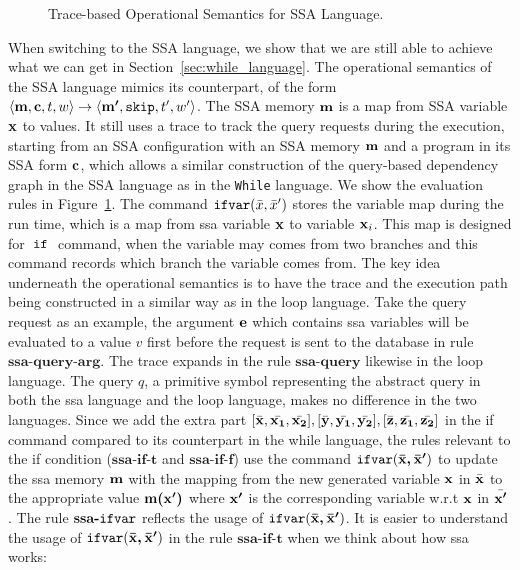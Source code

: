 {\begin{figure}
      \caption{Trace-based Operational Semantics for SSA Language.}
      \label{fig:os_ssa}
  \end{figure}
%
{
When switching to the SSA language, we show that we are still able to achieve what we can get in Section~\ref{sec:while_language}. 
The operational semantics of the SSA language mimics its counterpart, of the form $\langle {\boldsymbol{\mathbf{m}}}, {\boldsymbol{\mathbf{c}}}, t, w \rangle \to \langle {\boldsymbol{\mathbf{m'}}}, \mathtt{skip}, t', w' \rangle$. 
The SSA memory ${\boldsymbol{\mathbf{m}}}$ is a map from SSA variable ${\boldsymbol{\mathbf{x}}}$ to values.
It still uses a trace to track the query requests during the execution, starting from an SSA configuration with an SSA memory ${\boldsymbol{\mathbf{m}}}$ and a program in its SSA form ${\boldsymbol{\mathbf{c}}}$, 
which allows a similar construction of the query-based dependency graph in the SSA language as in the {\tt While} language.
We show the evaluation rules in Figure~\ref{fig:os_ssa}.
}
%
The command 
$\mathsf{\mathtt{ifvar}}(\bar{x},\bar{x}')$ stores the variable map during the run time, which is a map from ssa variable ${\boldsymbol{\mathbf{x}}}$ to variable ${\boldsymbol{\mathbf{x}}}_i$. 
This map is designed for $\;\mathtt{if}\;$ command, when the variable may comes from two branches and this command records which branch the variable comes from. 
%
%
{
The key idea underneath the operational semantics is to have the trace and the execution path being constructed in a similar way as in the loop language.
Take the query request as an example, the argument ${\boldsymbol{\mathbf{e}}}$ which contains ssa variables will be evaluated to a value $v$ first before the request is sent to the database in rule $\textbf{ssa-query-arg}$. 
The trace expands in the rule $\textbf{ssa-query}$ likewise in the loop language. 
The query $q$, a primitive symbol representing the abstract query in both the ssa language and  the loop language, makes no difference in the two languages. 
Since we add the extra part $[\bar{{\boldsymbol{\mathbf{x}}}}, \bar{{\boldsymbol{\mathbf{x_1}}}}, \bar{{\boldsymbol{\mathbf{x_2}}}}] ,[\bar{{\boldsymbol{\mathbf{y}}}}, \bar{{\boldsymbol{\mathbf{y_1}}}}, \bar{{\boldsymbol{\mathbf{y_2}}}}] ,[\bar{{\boldsymbol{\mathbf{z}}}},\bar{{\boldsymbol{\mathbf{z_1}}}}, \bar{{\boldsymbol{\mathbf{z_2}}}}]  $ 
in the if command compared to its counterpart in the while language, 
the rules relevant to the if condition ($\textbf{ssa-if-t}$ and $\textbf{ssa-if-f}$) use the command $\mathtt{ifvar}({\boldsymbol{\mathbf{\bar{x}, \bar{x}'}}})$ to update the ssa memory ${\boldsymbol{\mathbf{m}}}$ with the mapping from the new generated variable ${\boldsymbol{\mathbf{x}}}$ in $\bar{{\boldsymbol{\mathbf{x}}}}$ to the appropriate value ${\boldsymbol{\mathbf{m(x')}}}$ where ${\boldsymbol{\mathbf{x'}}}$ is the corresponding variable w.r.t ${\boldsymbol{\mathbf{x}}}$ in $\bar{{\boldsymbol{\mathbf{x'}}}}$.
%
The rule $\textbf{ssa-\ensuremath{\mathtt{ifvar}}}$ reflects the usage of $\mathtt{ifvar}({\boldsymbol{\mathbf{\bar{x}, \bar{x}'}}})$.
%
It is easier to understand the usage of $\mathtt{ifvar}({\boldsymbol{\mathbf{\bar{x}, \bar{x}'}}})$ in the rule $\textbf{ssa-if-t}$ when we think about how ssa works: 
}}
